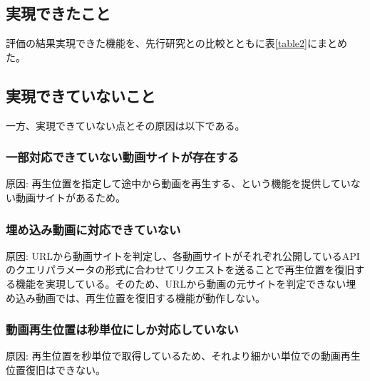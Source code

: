\documentclass[a4j,10pt]{jsarticle}
\begin{document}
\subsection{実現できたこと}
評価の結果実現できた機能を、先行研究との比較とともに表\ref{table2}にまとめた。
\begin{table}[t]
    \caption{}
    \label{table2}
    \begin{center}
    \end{center}
\end{table}

\subsection{実現できていないこと}
一方、実現できていない点とその原因は以下である。
\subsubsection{一部対応できていない動画サイトが存在する}
原因: 再生位置を指定して途中から動画を再生する、という機能を提供していない動画サイトがあるため。

\subsubsection{埋め込み動画に対応できていない}
原因: URLから動画サイトを判定し、各動画サイトがそれぞれ公開しているAPIのクエリパラメータの形式に合わせてリクエストを送ることで再生位置を復旧する機能を実現している。そのため、URLから動画の元サイトを判定できない埋め込み動画では、再生位置を復旧する機能が動作しない。

\subsubsection{動画再生位置は秒単位にしか対応していない}
原因: 再生位置を秒単位で取得しているため、それより細かい単位での動画再生位置復旧はできない。



\end{document}
